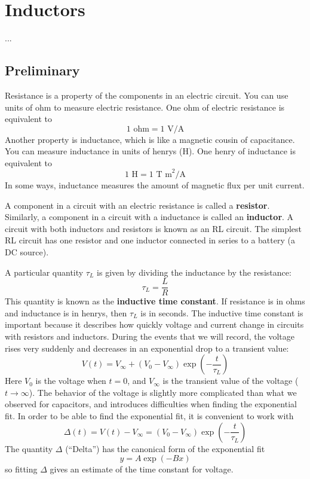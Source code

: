 \setcounter{chapter}{4}
\chapter{Inductors}
%
...
%
\section{Preliminary}
%
Resistance is a property of the components in an electric circuit. You can use units of ohm to measure electric resistance. One ohm of electric resistance is equivalent to
\begin{equation}
	1 \text{ ohm} = 1 \text{ V/A}
\end{equation}
Another property is inductance, which is like a magnetic cousin of capacitance. You can measure inductance in units of henrys (H). One henry of inductance is equivalent to
\begin{equation}
	1 \text{ H} = 1 \text{ T m}^{2}\text{/A}
\end{equation}
In some ways, inductance measures the amount of magnetic flux per unit current.

A component in a circuit with an electric resistance is called a \textbf{resistor}. Similarly, a component in a circuit with a inductance is called an \textbf{inductor}. A circuit with both inductors and resistors is known as an RL circuit. The simplest RL circuit has one resistor and one inductor connected in series to a battery (a DC source).

A particular quantity $\tau_{L}$ is given by dividing the inductance by the resistance:
\begin{equation}
	\tau_{L} = \frac{L}{R}
	\label{eq.05L.tauL}
\end{equation}
This quantity is known as the \textbf{inductive time constant}. If resistance is in ohms and inductance is in henrys, then $\tau_{L}$ is in seconds. The inductive time constant is important because it describes how quickly voltage and current change in circuits with resistors and inductors. During the events that we will record, the voltage rises very suddenly and decreases in an exponential drop to a transient value:
\begin{equation}
	V(t) = V_{\infty} + (V_{0} - V_{\infty}) \exp{\left( - \frac{t}{\tau_{L}} \right)}
	\label{eq.05L.Vt}
\end{equation}
Here $V_{0}$ is the voltage when $t = 0$, and $V_{\infty}$ is the transient value of the voltage ($t \longrightarrow \infty$). The behavior of the voltage is slightly more complicated than what we observed for capacitors, and introduces difficulties when finding the exponential fit. In order to be able to find the exponential fit, it is convenient to work with
\begin{equation}
	\Delta(t) = V(t) - V_{\infty} = (V_{0} - V_{\infty}) \exp{\left( - \frac{t}{\tau_{L}} \right)}
	\label{eq.05L.Delta.t}
\end{equation}
The quantity $\Delta$ (``Delta'') has the canonical form of the exponential fit
\begin{equation}
	y = A \exp{(-Bx)}
\end{equation}
so fitting $\Delta$ gives an estimate of the time constant for voltage.
%
